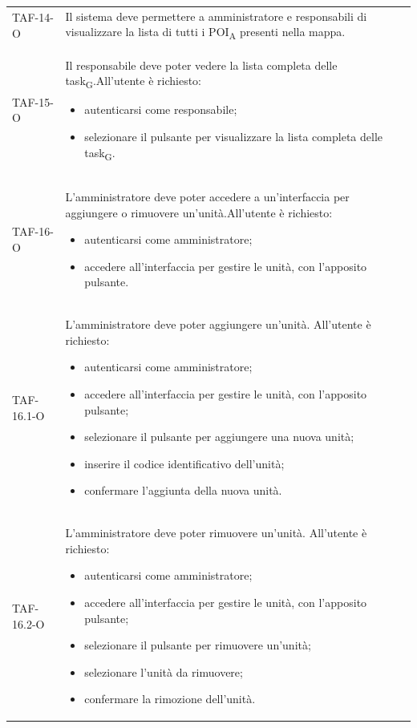 \begin{longtable}{ >{\centering}p{} >{}p{}
		>{\centering}p{}}
	TAF-14-O & Il sistema deve permettere a amministratore e responsabili di visualizzare la lista di tutti i POI\textsubscript{A} presenti nella mappa. & 0\tabularnewline

	TAF-15-O & Il responsabile deve poter vedere la lista completa delle task\textsubscript{G}.\newline All'utente è richiesto:\begin{itemize} \item autenticarsi come responsabile; \item selezionare il pulsante per visualizzare la lista completa delle task\textsubscript{G}. \end{itemize} & 0\tabularnewline

	TAF-16-O & L'amministratore deve poter accedere a un'interfaccia per aggiungere o rimuovere un'unità.\newline All'utente è richiesto: \begin{itemize} \item autenticarsi come amministratore; \item accedere all'interfaccia per gestire le unità, con l'apposito pulsante.\end{itemize} & 0\tabularnewline
	TAF-16.1-O & L'amministratore deve poter aggiungere un'unità. \newline All'utente è richiesto: \begin{itemize} \item autenticarsi come amministratore; \item accedere all'interfaccia per gestire le unità, con l'apposito pulsante; \item selezionare il pulsante per aggiungere una nuova unità; \item inserire il codice identificativo dell'unità; \item confermare l'aggiunta della nuova unità.\end{itemize} & 0\tabularnewline
	TAF-16.2-O & L'amministratore deve poter rimuovere un'unità. \newline All'utente è richiesto: \begin{itemize} \item autenticarsi come amministratore; \item accedere all'interfaccia per gestire le unità, con l'apposito pulsante; \item selezionare il pulsante per rimuovere un'unità; \item selezionare l'unità da rimuovere; \item confermare la rimozione dell'unità.\end{itemize} & 0\tabularnewline
	

\end{longtable}
